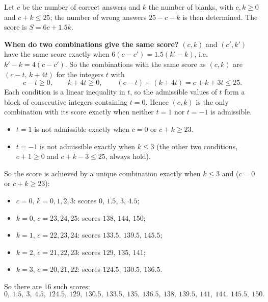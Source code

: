 Let $c$ be the number of correct answers and $k$ the number of blanks, with $c,k\ge0$ and $c+k\le25$; the number of wrong answers $25-c-k$ is then determined. The score is $S=6c+1.5k$.

\textbf{When do two combinations give the same score?} $(c,k)$ and $(c',k')$ have the same score exactly when $6(c-c')=1.5(k'-k)$, i.e. $k'-k=4(c-c')$. So the combinations with the same score as $(c,k)$ are $(c-t,\,k+4t)$ for the integers $t$ with
\[c-t\ge0,\qquad k+4t\ge0,\qquad (c-t)+(k+4t)=c+k+3t\le25.\]
Each condition is a linear inequality in $t$, so the admissible values of $t$ form a block of consecutive integers containing $t=0$. Hence $(c,k)$ is the only combination with its score exactly when neither $t=1$ nor $t=-1$ is admissible.
\begin{itemize}
\item $t=1$ is not admissible exactly when $c=0$ or $c+k\ge23$.
\item $t=-1$ is not admissible exactly when $k\le3$ (the other two conditions, $c+1\ge0$ and $c+k-3\le25$, always hold).
\end{itemize}
So the score is achieved by a unique combination exactly when $k\le3$ and ($c=0$ or $c+k\ge23$):
\begin{itemize}
\item $c=0$, $k=0,1,2,3$: scores $0$, $1.5$, $3$, $4.5$;
\item $k=0$, $c=23,24,25$: scores $138$, $144$, $150$;
\item $k=1$, $c=22,23,24$: scores $133.5$, $139.5$, $145.5$;
\item $k=2$, $c=21,22,23$: scores $129$, $135$, $141$;
\item $k=3$, $c=20,21,22$: scores $124.5$, $130.5$, $136.5$.
\end{itemize}
So there are $16$ such scores:
\[\boxed{0,\ 1.5,\ 3,\ 4.5,\ 124.5,\ 129,\ 130.5,\ 133.5,\ 135,\ 136.5,\ 138,\ 139.5,\ 141,\ 144,\ 145.5,\ 150}.\]
